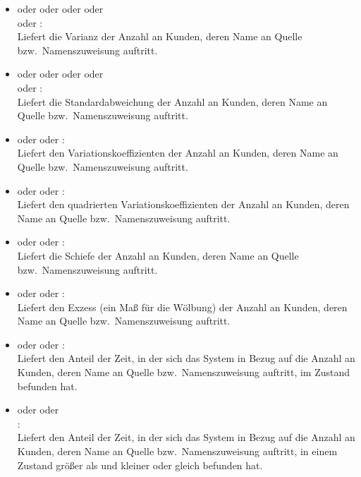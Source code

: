 \begin{itemize}
\item
{} oder  oder  oder  oder\\
 oder :\\
Liefert die Varianz der Anzahl an Kunden, deren Name an Quelle bzw.\ Namenszuweisung  auftritt.

\item
{} oder  oder  oder  oder\\
 oder :\\
Liefert die Standardabweichung der Anzahl an Kunden, deren Name an Quelle bzw.\ Namenszuweisung  auftritt.

\item
{} oder  oder :\\
Liefert den Variationskoeffizienten der Anzahl an Kunden, deren Name an Quelle bzw.\ Namenszuweisung  auftritt.

\item
{} oder  oder :\\
Liefert den quadrierten Variationskoeffizienten der Anzahl an Kunden, deren Name an Quelle bzw.\ Namenszuweisung  auftritt.

\item
{} oder  oder :\\
Liefert die Schiefe der Anzahl an Kunden, deren Name an Quelle bzw.\ Namenszuweisung  auftritt.

\item
{} oder  oder :\\
Liefert den Exzess (ein Maß für die Wölbung) der Anzahl an Kunden, deren Name an Quelle bzw.\ Namenszuweisung  auftritt.

\item
{} oder  oder :\\
Liefert den Anteil der Zeit, in der sich das System in Bezug auf die Anzahl an Kunden, deren Name an Quelle bzw.\ Namenszuweisung  auftritt, im Zustand  befunden hat.

\item
{} oder  oder\\
:\\
Liefert den Anteil der Zeit, in der sich das System in Bezug auf die Anzahl an Kunden, deren Name an Quelle bzw.\ Namenszuweisung  auftritt, in einem Zustand größer als  und kleiner oder gleich  befunden hat.

\end{itemize}



